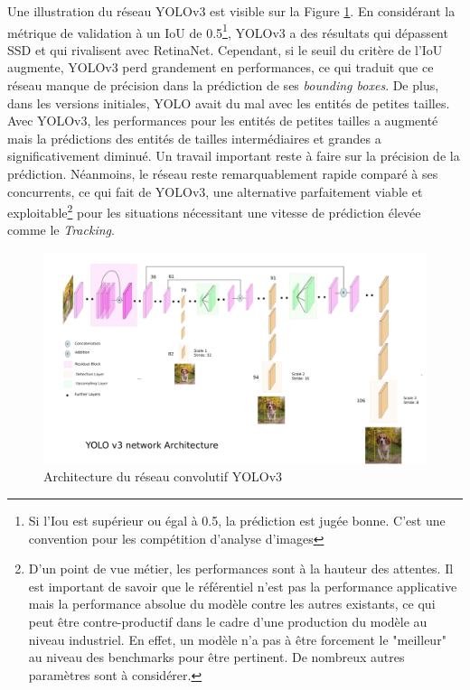 \noindent Une illustration du réseau YOLOv3 est visible sur la Figure \ref{yolov3net}. En considérant la métrique de validation à un IoU de 0.5\footnote{Si l'Iou est supérieur ou égal à 0.5, la prédiction est jugée bonne. C'est une convention pour les compétition d'analyse d'images}, YOLOv3 a des résultats qui dépassent SSD et qui rivalisent avec RetinaNet. Cependant, si le seuil du critère de l'IoU augmente, YOLOv3 perd grandement en performances, ce qui traduit que ce réseau manque de précision dans la prédiction de ses \textit{bounding boxes}. De plus, dans les versions initiales, YOLO avait du mal avec les entités de petites tailles. Avec YOLOv3, les performances pour les entités de petites tailles a augmenté mais la prédictions des entités de tailles intermédiaires et grandes a significativement diminué. Un travail important reste à faire sur la précision de la prédiction. Néanmoins, le réseau reste remarquablement rapide comparé à ses concurrents, ce qui fait de YOLOv3, une alternative parfaitement viable et exploitable\footnote{D'un point de vue métier, les performances sont à la hauteur des attentes. Il est important de savoir que le référentiel n'est pas la performance applicative mais la performance absolue du modèle contre les autres existants, ce qui peut être contre-productif dans le cadre d'une production du modèle au niveau industriel. En effet, un modèle n'a pas à être forcement le "meilleur" au niveau des benchmarks pour être pertinent. De nombreux autres paramètres sont à considérer.} pour les situations nécessitant une vitesse de prédiction élevée comme le \textit{Tracking}.

\begin{figure}
\centering
\includegraphics[scale=0.4]{./tex/computer-vision/sota/yolov3.png}
\caption{Architecture du réseau convolutif YOLOv3}
\label{yolov3net}
\end{figure}

